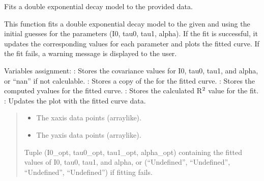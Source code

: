 \documentclass[letterpaper,10pt,english]{sphinxmanual}
\begin{document}
\begin{fulllineitems}
\begin{fulllineitems}
\end{fulllineitems}


\begin{fulllineitems}
\label{\detokenize{FLIMGraphics:FLIMGraphics.FLIMGraphic.fitDoubleExponential}}
\pysigstartsignatures
{}
\pysigstopsignatures
\sphinxAtStartPar
Fits a double exponential decay model to the provided data.

\sphinxAtStartPar
This function fits a double exponential decay model to the given  and  using the initial guesses for 
the parameters (I0, tau0, tau1, alpha). If the fit is successful, it updates the corresponding values for each 
parameter and plots the fitted curve. If the fit fails, a warning message is displayed to the user.

\sphinxAtStartPar
Variables assignment:
\sphinxhyphen{} : Stores the covariance values for I0, tau0, tau1, and alpha, or “nan” if not calculable.
\sphinxhyphen{} : Stores a copy of the  for the fitted curve.
\sphinxhyphen{} : Stores the computed y\sphinxhyphen{}values for the fitted curve.
\sphinxhyphen{} : Stores the calculated R\(\sp{\text{2}}\) value for the fit.
\sphinxhyphen{} : Updates the plot with the fitted curve data.
\begin{quote}\begin{description}
\begin{itemize}
\item {} 
\sphinxAtStartPar
{} \textendash{} The x\sphinxhyphen{}axis data points (array\sphinxhyphen{}like).

\item {} 
\sphinxAtStartPar
{} \textendash{} The y\sphinxhyphen{}axis data points (array\sphinxhyphen{}like).

\end{itemize}

\sphinxAtStartPar
Tuple (I0\_opt, tau0\_opt, tau1\_opt, alpha\_opt) containing the fitted values of I0, tau0, tau1, and alpha, 
or (“Undefined”, “Undefined”, “Undefined”, “Undefined”) if fitting fails.


\end{description}
\end{quote}
\end{fulllineitems}
\end{fulllineitems}
\end{document}

